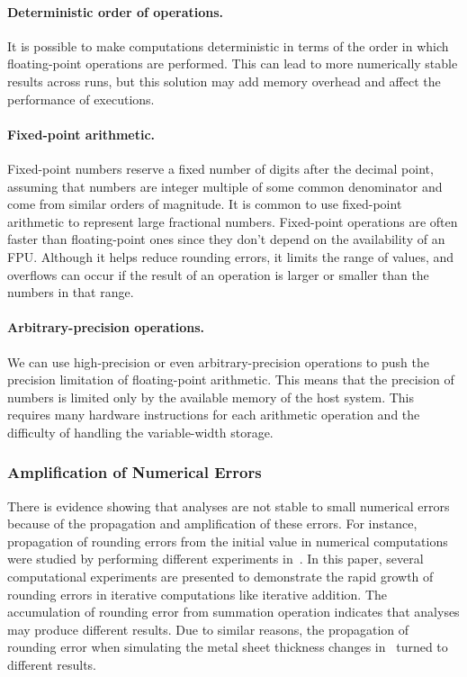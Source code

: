 \paragraph{Deterministic order of operations.} It is possible to make computations deterministic
in terms of the order in which floating-point operations are performed.
This can lead to more numerically stable results across runs,
but this solution may add memory overhead and affect the performance of executions.

\paragraph{Fixed-point arithmetic.} %
Fixed-point numbers reserve a fixed number of digits after the decimal point,
assuming that numbers are integer multiple of some common denominator and come from similar orders of magnitude. 
It is common to use fixed-point arithmetic to represent large fractional numbers. 
Fixed-point operations are often faster than floating-point ones since
they don't depend on the availability of an FPU.
Although it helps reduce rounding errors, it limits the range of values, and overflows can occur
if the result of an operation is larger or smaller than the numbers in that range.

\paragraph{Arbitrary-precision operations.} We can use high-precision or even arbitrary-precision
operations to push the precision limitation of floating-point arithmetic. 
This means that the precision of numbers is limited only by the available memory of the host system. 
This requires many hardware instructions for each arithmetic operation and the difficulty of handling the variable-width storage.


\subsubsection{Amplification of Numerical Errors}

There is evidence showing that analyses are not stable to small numerical 
errors because of the propagation and amplification of these errors. 
For instance, propagation of rounding errors from the initial value in 
numerical computations were studied by performing different experiments 
in~\cite{fadnavis1998some}. In this paper, several computational 
experiments are presented to demonstrate the rapid growth of rounding 
errors in iterative computations like iterative addition. The 
accumulation of rounding error from summation operation indicates that 
analyses may produce different results. Due to similar reasons, the 
propagation of rounding error when simulating the metal sheet thickness 
changes in~\cite{diethelm2012limits} turned to different results.

